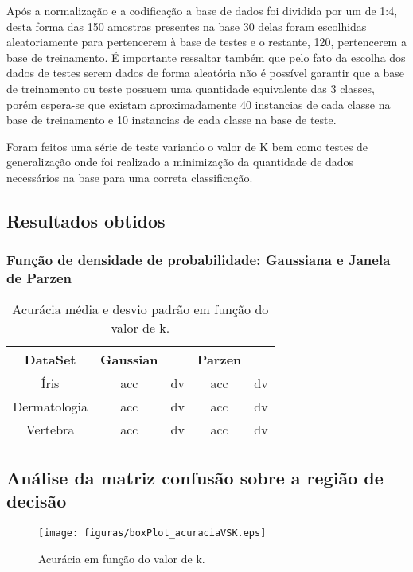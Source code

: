 \documentclass[ 
	article,			%
	11pt,				%
	oneside,			%
	a4paper,			%
	english,			%
	brazil,				%
	]{abntex2}
\begin{document}
Após a normalização e a codificação a base de dados foi dividida por um  de 1:4,
desta forma das 150 amostras presentes na base 30 delas foram escolhidas
aleatoriamente para pertencerem à base de testes e o restante, 120, pertencerem
a base de treinamento. É importante ressaltar também que pelo fato da escolha
dos dados de testes serem dados de forma aleatória não é possível garantir que a
base de treinamento ou teste possuem uma quantidade equivalente das 3 classes,
porém espera-se que existam aproximadamente 40 instancias de cada classe na base
de treinamento e 10 instancias de cada classe na base de teste.

Foram feitos uma série de teste variando o valor de K bem como testes de
generalização onde foi realizado a minimização da quantidade de dados
necessários na base para uma correta classificação.

\subsection{Resultados obtidos}

\subsubsection{Função de densidade de probabilidade: Gaussiana e Janela de
Parzen}

\begin{table}
	\centering
    \begin{tabular}{c|c|c|c|c}%

    DataSet      & Gaussian & & Parzen &  \\ \hline  
	Íris         & acc & dv & acc & dv \\ \hline 
	Dermatologia & acc & dv & acc & dv \\ \hline 
	Vertebra     & acc & dv & acc & dv   \\ \hline 

    \end{tabular}
    \caption{Acurácia média e desvio padrão em função do valor de k.}
    \label{tab:acuracia}
\end{table}

\subsection{Análise da matriz confusão sobre a região de decisão}

\begin{figure}[!htb] \centering
	\texttt{[image: figuras/boxPlot\_acuraciaVSK.eps]}
	\caption{Acurácia em função do valor de k.}
	\label{fig:acuracia}
\end{figure} 
\end{document}
